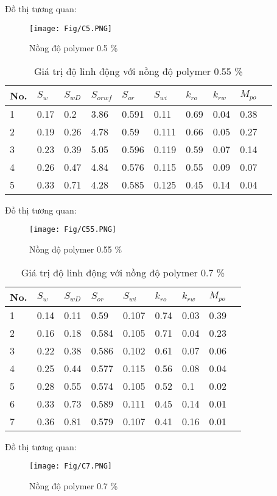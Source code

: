 \documentclass[12pt,a4paper]{article}
\begin{document}
Đồ thị tương quan:
	\begin{figure}[h]
		\centering
		\texttt{[image: Fig/C5.PNG]}
		\caption{Nồng độ polymer 0.5 \%}
	\end{figure}
\begin{table}[h]
\centering
\caption{Giá trị độ linh động với nồng độ polymer 0.55 \%}
\label{my-label}
\begin{tabularx}{\textwidth}{@{}XXXXXXXXXX@{}}
\toprule
No. & $S_w$ & $S_{wD}$ & $S_{orwf}$ & $S_{or}$ & $S_{wi}$ & $k_{ro}$ & $k_{rw}$ & $M_{po}$ \\ \midrule
1   & 0.17  & 0.2      & 3.86       & 0.591    & 0.11     & 0.69     & 0.04     & 0.38     \\
2   & 0.19  & 0.26     & 4.78       & 0.59     & 0.111    & 0.66     & 0.05     & 0.27     \\
3   & 0.23  & 0.39     & 5.05       & 0.596    & 0.119    & 0.59     & 0.07     & 0.14     \\
4   & 0.26  & 0.47     & 4.84       & 0.576    & 0.115    & 0.55     & 0.09     & 0.07     \\
5   & 0.33  & 0.71     & 4.28       & 0.585    & 0.125    & 0.45     & 0.14     & 0.04     \\ \bottomrule
\end{tabularx}
\end{table}
\newpage
Đồ thị tương quan:
	\begin{figure}[h]
		\centering
		\texttt{[image: Fig/C55.PNG]}
		\caption{Nồng độ polymer 0.55 \%}
	\end{figure}

\begin{table}[h]
\centering
\caption{Giá trị độ linh động với nồng độ polymer 0.7 \%}
\label{my-label}
\begin{tabularx}{\textwidth}{@{}XXXXXXXXX@{}}
\toprule
No. & $S_w$ & $S_{wD}$ & $S_{or}$ & $S_{wi}$ & $k_{ro}$ & $k_{rw}$ & $M_{po}$ \\ \midrule
1   & 0.14  & 0.11     & 0.59     & 0.107    & 0.74     & 0.03     & 0.39     \\
2   & 0.16  & 0.18     & 0.584    & 0.105    & 0.71     & 0.04     & 0.23     \\
3   & 0.22  & 0.38     & 0.586    & 0.102    & 0.61     & 0.07     & 0.06     \\
4   & 0.25  & 0.44     & 0.577    & 0.115    & 0.56     & 0.08     & 0.04     \\
5   & 0.28  & 0.55     & 0.574    & 0.105    & 0.52     & 0.1      & 0.02     \\
6   & 0.33  & 0.73     & 0.589    & 0.111    & 0.45     & 0.14     & 0.01     \\
7   & 0.36  & 0.81     & 0.579    & 0.107    & 0.41     & 0.16     & 0.01     \\ \bottomrule
\end{tabularx}
\end{table}
\newpage
	Đồ thị tương quan:
	\begin{figure}[h]
		\centering
		\texttt{[image: Fig/C7.PNG]}
		\caption{Nồng độ polymer 0.7 \%}
	\end{figure}
	\clearpage
\end{document}

